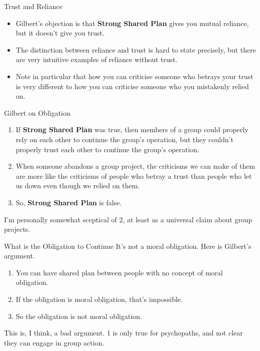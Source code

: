 \documentclass[
  ignorenonframetext,
]{beamer}
\providecommand{\tightlist}{%
  \setlength{\itemsep}{0pt}\setlength{\parskip}{0pt}}
\begin{document}
\begin{frame}{Trust and Reliance}
\protect\hypertarget{trust-and-reliance}{}
\begin{itemize}
\tightlist
\item
  Gilbert's objection is that \textbf{Strong Shared Plan} gives you
  mutual reliance, but it doesn't give you trust.
\item
  The distinction between reliance and trust is hard to state precisely,
  but there are very intuitive examples of reliance without trust.
\item
  Note in particular that how you can criticise someone who betrays your
  trust is very different to how you can criticise someone who you
  mistakenly relied on.
\end{itemize}
\end{frame}

\begin{frame}{Gilbert on Obligation}
\protect\hypertarget{gilbert-on-obligation}{}
\begin{enumerate}
\tightlist
\item
  If \textbf{Strong Shared Plan} was true, then members of a group could
  properly rely on each other to continue the group's operation, but
  they couldn't properly trust each other to continue the group's
  operation.
\item
  When someone abandons a group project, the criticisms we can make of
  them are more like the criticisms of people who betray a trust than
  people who let us down even though we relied on them.
\item
  So, \textbf{Strong Shared Plan} is false.
\end{enumerate}

I'm personally somewhat sceptical of 2, at least as a universal claim
about group projects.
\end{frame}

\begin{frame}{What is the Obligation to Continue}
\protect\hypertarget{what-is-the-obligation-to-continue}{}
It's not a moral obligation. Here is Gilbert's argument.

\begin{enumerate}
\tightlist
\item
  You can have shared plan between people with no concept of moral
  obligation.
\item
  If the obligation is moral obligation, that's impossible.
\item
  So the obligation is not moral obligation. \pause
\end{enumerate}

This is, I think, a bad argument. 1 is only true for psychopaths, and
not clear they can engage in group action.
\end{frame}
\end{document}
